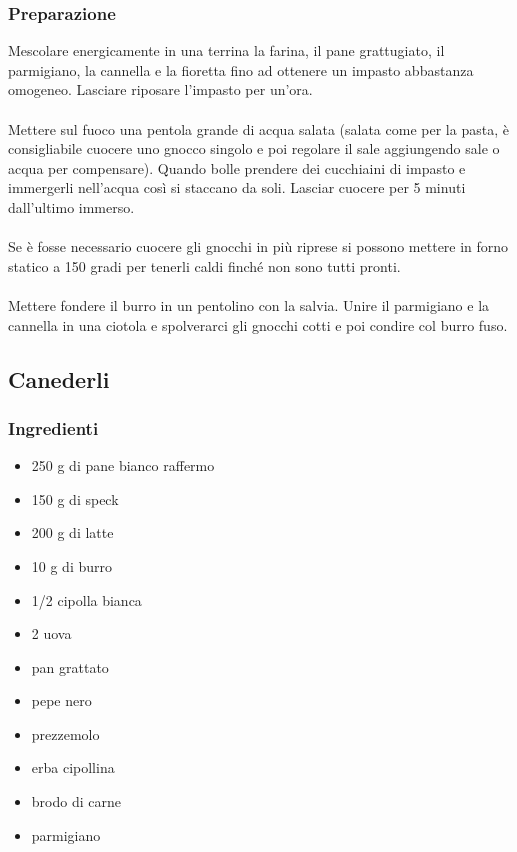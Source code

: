 \documentclass[12pt, a4paper]{article}
\begin{document}
\subsubsection{Preparazione}
	Mescolare energicamente in una terrina la farina, il pane grattugiato,
	il parmigiano, la cannella e la fioretta fino ad ottenere un impasto
	abbastanza omogeneo. Lasciare riposare l'impasto per un'ora.\\\\
	Mettere sul fuoco una pentola grande di acqua salata (salata come per la pasta, 
	è consigliabile cuocere uno gnocco singolo e poi regolare il sale aggiungendo 
	sale o acqua per compensare). Quando bolle prendere dei cucchiaini di impasto e 
	immergerli nell'acqua così si staccano	da soli. Lasciar cuocere per 5 minuti
	dall'ultimo immerso.\\\\
	Se è fosse necessario cuocere gli gnocchi in più riprese si possono
	mettere in forno statico a 150 gradi per tenerli caldi finché non sono tutti 
	pronti.\\\\
	Mettere fondere il burro in un pentolino con la salvia. Unire il parmigiano e
	la cannella in una ciotola e spolverarci gli gnocchi cotti e poi condire col burro
	fuso.
\clearpage

\subsection{Canederli}

\subsubsection{Ingredienti}
\begin{itemize}
\item	250 g di pane bianco raffermo
\item	150 g di speck
\item 	200 g di latte
\item	10 g di burro
\item 	1/2 cipolla bianca
\item 	2 uova
\item	pan grattato
\item	pepe nero
\item	prezzemolo
\item	erba cipollina
\item	brodo di carne
\item	parmigiano
\end{itemize}
\end{document}

